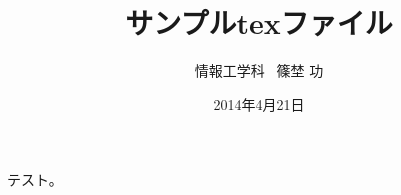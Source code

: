 \documentclass[a4j,12pt]{jarticle}
\title{サンプルtexファイル}
\date{2014年4月21日}
\author{情報工学科 \ 篠埜 功}
\begin{document}
\maketitle

テスト。
\end{document}

